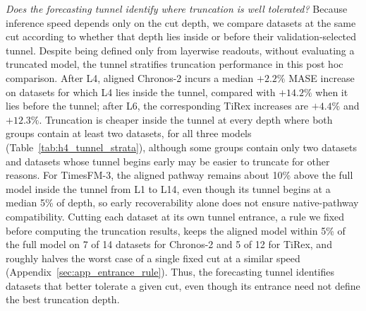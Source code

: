 \documentclass{article} %
\begin{document}
\textit{Does the forecasting tunnel identify where truncation is well tolerated?}
Because inference speed depends only on the cut depth, we compare datasets at the same cut according to whether that depth lies inside or before their validation-selected tunnel. Despite being defined only from layerwise readouts, without evaluating a truncated model, the tunnel stratifies truncation performance in this post hoc comparison. After L4, aligned Chronos-2 incurs a median $+2.2\%$ MASE increase on datasets for which L4 lies inside the tunnel, compared with $+14.2\%$ when it lies before the tunnel; after L6, the corresponding TiRex increases are $+4.4\%$ and $+12.3\%$. Truncation is cheaper inside the tunnel at every depth where both groups contain at least two datasets, for all three models (Table~\ref{tab:h4_tunnel_strata}), although some groups contain only two datasets and datasets whose tunnel begins early may be easier to truncate for other reasons. For TimesFM-3, the aligned pathway remains about 10\% above the full model inside the tunnel from L1 to L14, even though its tunnel begins at a median 5\% of depth, so early recoverability alone does not ensure native-pathway compatibility. Cutting each dataset at its own tunnel entrance, a rule we fixed before computing the truncation results, keeps the aligned model within 5\% of the full model on 7 of 14 datasets for Chronos-2 and 5 of 12 for TiRex, and roughly halves the worst case of a single fixed cut at a similar speed (Appendix~\ref{sec:app_entrance_rule}). Thus, the forecasting tunnel identifies datasets that better tolerate a given cut, even though its entrance need not define the best truncation depth.
\end{document}
